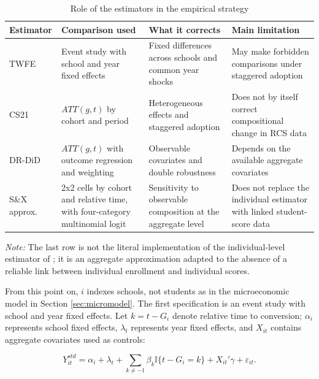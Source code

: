 \begin{table}[htbp]
\centering
\caption{Role of the estimators in the empirical strategy}
\label{tab:estimadores}
\small
\begin{threeparttable}
\begin{tabular}{p{2.4cm}p{3.3cm}p{3.7cm}p{3.5cm}}
\toprule
Estimator & Comparison used & What it corrects & Main limitation \\
\midrule
TWFE & Event study with school and year fixed effects & Fixed differences across schools and common year shocks & May make forbidden comparisons under staggered adoption \\
CS21 & $ATT(g,t)$ by cohort and period & Heterogeneous effects and staggered adoption & Does not by itself correct compositional change in RCS data \\
DR-DiD & $ATT(g,t)$ with outcome regression and weighting & Observable covariates and double robustness & Depends on the available aggregate covariates \\
S\&X approx. & 2x2 cells by cohort and relative time, with four-category multinomial logit & Sensitivity to observable composition at the aggregate level & Does not replace the individual estimator with linked student-score data \\
\bottomrule
\end{tabular}
\begin{tablenotes}
\footnotesize
\item \textit{Note:} The last row is not the literal implementation of the individual-level estimator of \textcite{santannaxu}; it is an aggregate approximation adapted to the absence of a reliable link between individual enrollment and individual scores.
\end{tablenotes}
\end{threeparttable}
\end{table}

From this point on, $i$ indexes schools, not students as in the microeconomic model in Section \ref{sec:micromodel}. The first specification is an event study with school and year fixed effects. Let $k=t-G_i$ denote relative time to conversion; $\alpha_i$ represents school fixed effects, $\lambda_t$ represents year fixed effects, and $X_{it}$ contains aggregate covariates used as controls:

\begin{equation}
Y_{it}^{std} = \alpha_i + \lambda_t + \sum_{k \neq -1} \beta_k \mathbb{I}\{t - G_i = k\} + X_{it}'\gamma + \varepsilon_{it}.
\end{equation}

